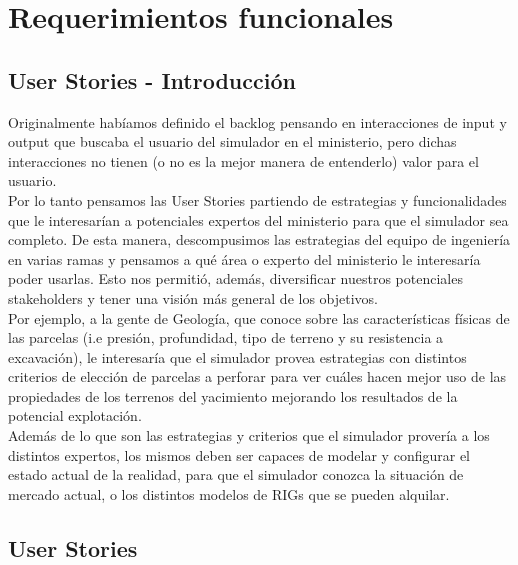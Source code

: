 \section{Requerimientos funcionales}

\newcommand{\BV}{Business Value}
\newcommand{\SP}{Story Points}
\newcommand{\US}[1]{\textbf{US #1}}
\newcommand{\UUSS}{User Stories}
\newcommand{\fixme}[1]{\large\textcolor{red}{#1}}

\subsection{User Stories - Introducción}

Originalmente habíamos definido el backlog pensando en interacciones de input y output que buscaba el usuario del simulador en el ministerio, pero dichas interacciones no tienen (o no es la mejor manera de entenderlo) valor para el usuario.
\\

Por lo tanto pensamos las User Stories partiendo de estrategias y funcionalidades que le interesarían a potenciales expertos del ministerio para que el simulador sea completo. De esta manera, descompusimos las estrategias del equipo de ingeniería en varias ramas y pensamos a qué área o experto del ministerio le interesaría poder usarlas. Esto nos permitió, además, diversificar nuestros potenciales stakeholders y tener una visión más general de los objetivos.
\\

Por ejemplo, a la gente de Geología, que conoce sobre las características físicas de las parcelas (i.e presión, profundidad, tipo de terreno y su resistencia a excavación), le interesaría que el simulador provea estrategias con distintos criterios de elección de parcelas a perforar para ver cuáles hacen mejor uso de las propiedades de los terrenos del yacimiento mejorando los resultados de la potencial explotación.\\

Además de lo que son las estrategias y criterios que el simulador provería a los 
distintos expertos, los mismos deben ser capaces de modelar y configurar el estado 
actual de la realidad, para que el simulador conozca la situación de mercado actual, 
o los distintos modelos de RIGs que se pueden alquilar. 

\subsection{User Stories}

